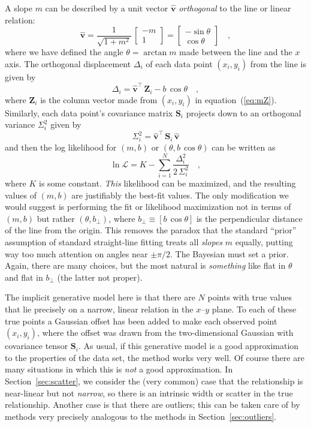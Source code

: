 \documentclass[12pt,twoside]{article}
\newcommand{\sectionname}{Section}
\newcommand{\equationname}{equation}
\newcommand{\mmatrix}[1]{\boldsymbol{#1}}
\newcommand{\transpose}[1]{{#1}^{\scriptscriptstyle \top}}
\newcommand{\mS}{\mmatrix{S}}
\newcommand{\mZ}{\mmatrix{Z}}
\newcommand{\vhat}{\mmatrix{\hat{v}}}
\newcommand{\like}{\mathscr{L}}
\newcommand{\bperp}{b_{\perp}}
\begin{document}
A slope $m$ can be described by a unit vector $\vhat$
\emph{orthogonal} to the line or linear relation:
\begin{equation}
\vhat
 = \frac{1}{\sqrt{1+m^2}}\,\left[\begin{array}{c}-m\\1\end{array}\right]
 = \left[\begin{array}{c}-\sin\theta\\\cos\theta\end{array}\right] \quad ,
\end{equation}
where we have defined the angle $\theta = \arctan m$ made between the
line and the $x$ axis.  The orthogonal displacement $\Delta_i$ of each
data point $(x_i,y_i)$ from the line is given by
\begin{equation}
\Delta_i = \transpose{\vhat}\,\mZ_i - b\,\cos\theta \quad ,
\end{equation}
where $\mZ_i$ is the column vector made from $(x_i,y_i)$ in
\equationname~(\ref{eq:mZ}).  Similarly, each data point's covariance
matrix $\mS_i$ projects down to an orthogonal variance $\Sigma_i^2$ given by
\begin{equation}\label{eq:Sigma}
\Sigma_i^2 = \transpose{\vhat}\,\mS_i\,\vhat
\end{equation}
and then the log likelihood for $(m,b)$ or $(\theta,b\,\cos\theta)$
can be written as
\begin{equation}\label{eq:twodlike}
\ln\like = K - \sum_{i=1}^N \frac{\Delta_i^2}{2\,\Sigma_{i}^2} \quad ,
\end{equation}
where $K$ is some constant.  \emph{This} likelihood can be maximized,
and the resulting values of $(m,b)$ are justifiably the best-fit
values.  The only modification we would suggest is performing the fit
or likelihood maximization not in terms of $(m,b)$ but rather
$(\theta,\bperp)$, where $\bperp\equiv[b\,\cos\theta]$ is the
perpendicular distance of the line from the origin.  This removes the
paradox that the standard ``prior'' assumption of standard
straight-line fitting treats all \emph{slopes} $m$ equally, putting
way too much attention on angles near $\pm\pi/2$.  The Bayesian must
set a prior.  Again, there are many choices, but the most natural
is \emph{something} like flat in $\theta$ and flat in $\bperp$ (the
latter not proper).

The implicit generative model here is that there are $N$ points with
true values that lie precisely on a narrow, linear relation in the
$x$--$y$ plane.  To each of these true points a Gaussian offset has
been added to make each observed point $(x_i,y_i)$, where the offset
was drawn from the two-dimensional Gaussian with covariance tensor
$\mS_i$.  As usual, if this generative model is a good approximation
to the properties of the data set, the method works very well.  Of
course there are many situations in which this is \emph{not} a good
approximation.  In \sectionname~\ref{sec:scatter}, we consider the
(very common) case that the relationship is near-linear but not
\emph{narrow}, so there is an intrinsic width or scatter in the true
relationship.  Another case is that there are outliers; this can be
taken care of by methods very precisely analogous to the methods in
\sectionname~\ref{sec:outliers}.
\end{document}
